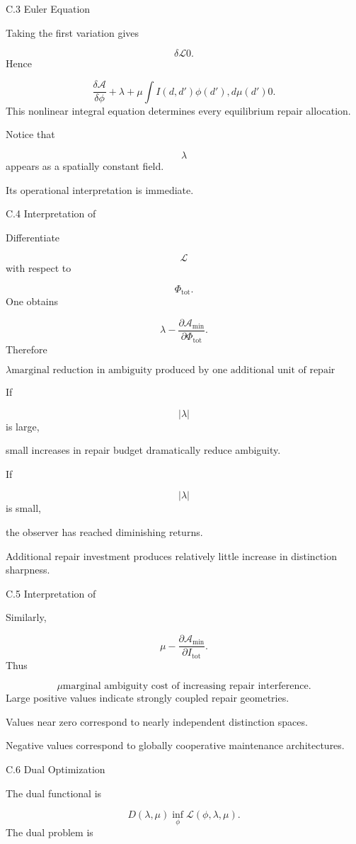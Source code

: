 \documentclass[12pt,oneside]{article}
\theoremstyle{plain}
\theoremstyle{definition}
\theoremstyle{remark}
\begin{document}
C.3 Euler Equation

Taking the first variation gives

\[
\delta\mathcal L
0. 
\]
Hence

\[
\frac{\delta\mathcal A}
{\delta\phi}
+
\lambda
+
\mu
\int
I(d,d')
\phi(d')
,d\mu(d')
0. 
\]
This nonlinear integral equation determines every equilibrium repair allocation.

Notice that

\[
\lambda
\]
appears as a spatially constant field.

Its operational interpretation is immediate.


C.4 Interpretation of \lambda

Differentiate

\[
\mathcal L
\]
with respect to

\[
\Phi_{\mathrm{tot}}.
\]
One obtains

\[
\lambda
- 
\frac{\partial
\mathcal A_{\min}}
{\partial
\Phi_{\mathrm{tot}}}.
\]
Therefore

\[
\boxed{
\lambda
\text{marginal reduction in ambiguity produced by one additional unit of repair capacity.}
}
\]

If

\[
|\lambda|
\]
is large,

small increases in repair budget dramatically reduce ambiguity.

If

\[
|\lambda|
\]
is small,

the observer has reached diminishing returns.

Additional repair investment produces relatively little increase in distinction sharpness.


C.5 Interpretation of \mu

Similarly,

\[
\mu
- 
\frac{\partial
\mathcal A_{\min}}
{\partial
I_{\mathrm{tot}}}.
\]
Thus

\[
\boxed{
\mu
\text{marginal ambiguity cost of increasing repair interference.}
}
\]
Large positive values indicate strongly coupled repair geometries.

Values near zero correspond to nearly independent distinction spaces.

Negative values correspond to globally cooperative maintenance architectures.


C.6 Dual Optimization

The dual functional is

\[
D(\lambda,\mu)
\inf_\phi
\mathcal L(\phi,\lambda,\mu).
\]
The dual problem is
\end{document}
